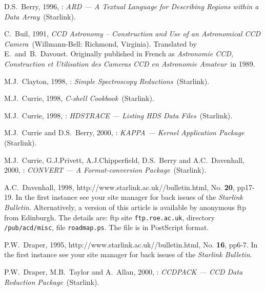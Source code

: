 \documentclass[twoside,11pt]{starlink}
\begin{document}
\newpage
{}
\begin{thebibliography}{99}

   D.S.~Berry, 1996, : \textit{ARD --- A Textual Language for Describing Regions within a Data Array}\,
   (Starlink).

   C.~Buil, 1991, \textit{CCD Astronomy -- Construction
   and Use of an Astronomical CCD Camera}\, (Willmann-Bell: Richmond,
   Virginia).  Translated by E.~and~B.~Davoust.  Originally published
   in French as \textit{Astronomie CCD, Construction et Utilisation des
   Cameras CCD en Astronomie Amateur}\, in 1989.

   M.J.~Clayton, 1998, : \textit{Simple
   Spectroscopy Reductions}\, (Starlink).

   M.J.~Currie, 1998,  \textit{C-shell
   Cookbook}\, (Starlink).

   M.J.~Currie, 1998, :
   \textit{HDSTRACE --- Listing HDS Data Files}\, (Starlink).

   M.J.~Currie and D.S.~Berry, 2000,
   : \textit{KAPPA --- Kernel Application Package}\,
   (Starlink).

   M.J.~Currie, G.J.Privett, A.J.Chipperfield,
   D.S.~Berry and A.C.~Davenhall, 2000, : \textit{CONVERT --- A Format-conversion Package}\, (Starlink).

   A.C.~Davenhall, 1998,
   {http://www.starlink.ac.uk//bulletin.html},
   No. \textbf{20}, pp17-19.  In the first instance see your site manager
   for back issues of the \textit{Starlink Bulletin}.  Alternatively, a
   version of this article is available by anonymous ftp from Edinburgh.
   The details are: ftp site \texttt{ftp.roe.ac.uk}, directory \texttt{/pub/acd/misc}, file \texttt{roadmap.ps}.  The file is in PostScript
   format.

   P.W.~Draper, 1995,
   {http://www.starlink.ac.uk//bulletin.html},
   No. \textbf{16}, pp6-7.  In the first instance see your site manager
   for back issues of the \textit{Starlink Bulletin}.

   P.W.~Draper, M.B.~Taylor and A.~Allan, 2000,
   : \textit{CCDPACK --- CCD Data Reduction
   Package}\, (Starlink).


\end{thebibliography}
\end{document}
